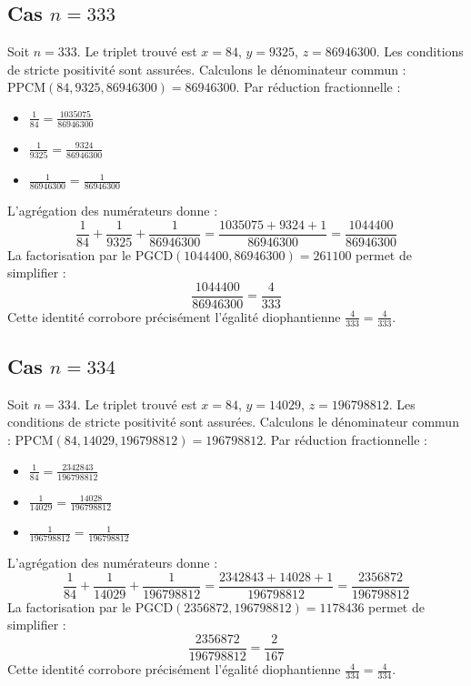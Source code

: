 \documentclass[11pt,a4paper]{article}
\begin{document}
\subsection{Cas $n = 333$}
Soit $n = 333$. Le triplet trouvé est $x = 84$, $y = 9325$, $z = 86946300$.
Les conditions de stricte positivité sont assurées.
Calculons le dénominateur commun : $\text{PPCM}(84, 9325, 86946300) = 86946300$.
Par réduction fractionnelle :
\begin{itemize}
    \item $\frac{1}{84} = \frac{1035075}{86946300}$
    \item $\frac{1}{9325} = \frac{9324}{86946300}$
    \item $\frac{1}{86946300} = \frac{1}{86946300}$
\end{itemize}
L'agrégation des numérateurs donne :
$$ \frac{1}{84} + \frac{1}{9325} + \frac{1}{86946300} = \frac{1035075 + 9324 + 1}{86946300} = \frac{1044400}{86946300} $$
La factorisation par le $\text{PGCD}(1044400, 86946300) = 261100$ permet de simplifier :
$$ \frac{1044400}{86946300} = \frac{4}{333} $$
Cette identité corrobore précisément l'égalité diophantienne $\frac{4}{333} = \frac{4}{333}$.

\subsection{Cas $n = 334$}
Soit $n = 334$. Le triplet trouvé est $x = 84$, $y = 14029$, $z = 196798812$.
Les conditions de stricte positivité sont assurées.
Calculons le dénominateur commun : $\text{PPCM}(84, 14029, 196798812) = 196798812$.
Par réduction fractionnelle :
\begin{itemize}
    \item $\frac{1}{84} = \frac{2342843}{196798812}$
    \item $\frac{1}{14029} = \frac{14028}{196798812}$
    \item $\frac{1}{196798812} = \frac{1}{196798812}$
\end{itemize}
L'agrégation des numérateurs donne :
$$ \frac{1}{84} + \frac{1}{14029} + \frac{1}{196798812} = \frac{2342843 + 14028 + 1}{196798812} = \frac{2356872}{196798812} $$
La factorisation par le $\text{PGCD}(2356872, 196798812) = 1178436$ permet de simplifier :
$$ \frac{2356872}{196798812} = \frac{2}{167} $$
Cette identité corrobore précisément l'égalité diophantienne $\frac{4}{334} = \frac{4}{334}$.
\end{document}
